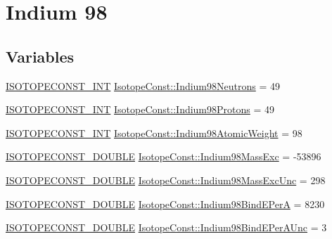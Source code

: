 \hypertarget{group___isotope_const-_indium-_in98}{}\section{Indium 98}
\label{group___isotope_const-_indium-_in98}
\subsection*{Variables}
\begin{DoxyCompactItemize}
\item 
\mbox{\hyperlink{group___isotope_const-_macros_ga5f18360b3e99483a35c32d789e62621c}{I\+S\+O\+T\+O\+P\+E\+C\+O\+N\+S\+T\+\_\+\+I\+NT}} \mbox{\hyperlink{group___isotope_const-_indium-_in98_gae16b2c2be977e60b98f09e2b39669a3e}{Isotope\+Const\+::\+Indium98\+Neutrons}} = 49
\item 
\mbox{\hyperlink{group___isotope_const-_macros_ga5f18360b3e99483a35c32d789e62621c}{I\+S\+O\+T\+O\+P\+E\+C\+O\+N\+S\+T\+\_\+\+I\+NT}} \mbox{\hyperlink{group___isotope_const-_indium-_in98_gac10e33adf9702cb3f4cd6177a52ac59e}{Isotope\+Const\+::\+Indium98\+Protons}} = 49
\item 
\mbox{\hyperlink{group___isotope_const-_macros_ga5f18360b3e99483a35c32d789e62621c}{I\+S\+O\+T\+O\+P\+E\+C\+O\+N\+S\+T\+\_\+\+I\+NT}} \mbox{\hyperlink{group___isotope_const-_indium-_in98_ga8f13b6492cde3d5542f4efb9c5ed1f0b}{Isotope\+Const\+::\+Indium98\+Atomic\+Weight}} = 98
\item 
\mbox{\hyperlink{group___isotope_const-_macros_ga8f45a7272ce02c0b4c65c44636ed719a}{I\+S\+O\+T\+O\+P\+E\+C\+O\+N\+S\+T\+\_\+\+D\+O\+U\+B\+LE}} \mbox{\hyperlink{group___isotope_const-_indium-_in98_ga3be2196cb35bd46898dc13d309e2ff0b}{Isotope\+Const\+::\+Indium98\+Mass\+Exc}} = -\/53896
\item 
\mbox{\hyperlink{group___isotope_const-_macros_ga8f45a7272ce02c0b4c65c44636ed719a}{I\+S\+O\+T\+O\+P\+E\+C\+O\+N\+S\+T\+\_\+\+D\+O\+U\+B\+LE}} \mbox{\hyperlink{group___isotope_const-_indium-_in98_gaeb91b076de77ee941e6ea9b589f5bb27}{Isotope\+Const\+::\+Indium98\+Mass\+Exc\+Unc}} = 298
\item 
\mbox{\hyperlink{group___isotope_const-_macros_ga8f45a7272ce02c0b4c65c44636ed719a}{I\+S\+O\+T\+O\+P\+E\+C\+O\+N\+S\+T\+\_\+\+D\+O\+U\+B\+LE}} \mbox{\hyperlink{group___isotope_const-_indium-_in98_gaa36440f2da08ea5596cdc58a9b6655f8}{Isotope\+Const\+::\+Indium98\+Bind\+E\+PerA}} = 8230
\item 
\mbox{\hyperlink{group___isotope_const-_macros_ga8f45a7272ce02c0b4c65c44636ed719a}{I\+S\+O\+T\+O\+P\+E\+C\+O\+N\+S\+T\+\_\+\+D\+O\+U\+B\+LE}} \mbox{\hyperlink{group___isotope_const-_indium-_in98_ga99bce44ef588e628714f2fe0b18f9744}{Isotope\+Const\+::\+Indium98\+Bind\+E\+Per\+A\+Unc}} = 3

\end{DoxyCompactItemize}
